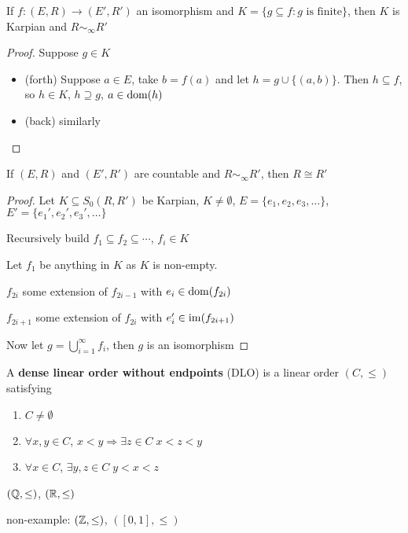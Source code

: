 \documentclass[11pt]{article}
\begin{document}
\begin{proposition}[]
If \(f:(E,R)\to(E',R')\) an isomorphism and \(K=\{g\subseteq f:g\text{ is finite}\}\), then \(K\) is Karpian
and \(R\sim_\infty R'\)
\end{proposition}

\begin{proof}
Suppose \(g\in K\)
\begin{itemize}
\item (forth) Suppose \(a\in E\), take \(b=f(a)\) and let \(h=g\cup\{(a,b)\}\). Then \(h\subseteq f\),
so \(h\in K\), \(h\supseteq g\), \(a\in\operatorname{dom}(h)\)
\item (back) similarly
\end{itemize}
\end{proof}

\begin{proposition}[]
If \((E,R)\) and \((E',R')\) are countable and \(R\sim_\infty R'\), then \(R\cong R'\)
\end{proposition}

\begin{proof}
Let \(K\subseteq S_0(R,R')\) be Karpian, \(K\neq\emptyset\), \(E=\{e_1,e_2,e_3,\dots\}\), \(E'=\{e_1',e_2',e_3',\dots\}\)

Recursively build \(f_1\subseteq f_2\subseteq\cdots\), \(f_i\in K\)

Let \(f_1\) be anything in \(K\) as \(K\) is non-empty.

\(f_{2i}\) some extension of \(f_{2i-1}\) with \(e_i\in\operatorname{dom}(f_{2i})\)

\(f_{2i+1}\) some extension of \(f_{2i}\) with \(e_i'\in\operatorname{im}(f_{2i+1})\)

Now let \(g=\bigcup_{i=1}^\infty f_i\), then \(g\) is an isomorphism
\end{proof}

\begin{definition}[]
A \textbf{dense linear order without endpoints} (DLO) is a linear order \((C,\le)\) satisfying
\begin{enumerate}
\item \(C\neq\emptyset\)
\item \(\forall x,y\in C\), \(x<y\Rightarrow\exists z\in C\; x<z<y\)
\item \(\forall x\in C\), \(\exists y,z\in C\;y<x<z\)
\end{enumerate}
\end{definition}

\begin{examplle}[]
\((\mathbb{Q},\le)\), \((\mathbb{R},\le)\)

non-example: \((\mathbb{Z},\le)\), \(([0,1],\le)\)
\end{examplle}
\end{document}

